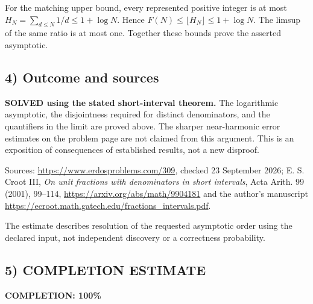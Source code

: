For the matching upper bound, every represented positive integer is at most $H_N=\sum_{d\le N}1/d\le1+\log N$. Hence $F(N)\le\lfloor H_N\rfloor\le1+\log N$. The limsup of the same ratio is at most one. Together these bounds prove the asserted asymptotic.

\subsection*{4) Outcome and sources}
\textbf{SOLVED using the stated short-interval theorem.} The logarithmic asymptotic, the disjointness required for distinct denominators, and the quantifiers in the limit are proved above. The sharper near-harmonic error estimates on the problem page are not claimed from this argument. This is an exposition of consequences of established results, not a new disproof.

Sources: \url{https://www.erdosproblems.com/309}, checked 23 September 2026; E. S. Croot III, \emph{On unit fractions with denominators in short intervals}, Acta Arith. 99 (2001), 99--114, \url{https://arxiv.org/abs/math/9904181} and the author's manuscript \url{https://ecroot.math.gatech.edu/fractions_intervals.pdf}.

The estimate describes resolution of the requested asymptotic order using the declared input, not independent discovery or a correctness probability.
\subsection*{5) COMPLETION ESTIMATE}
\textbf{COMPLETION: 100\%}
